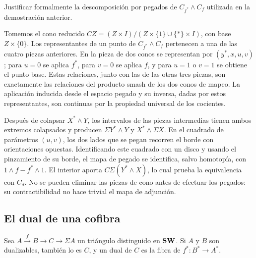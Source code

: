 \begin{ejer}
Justificar formalmente la descomposición por pegados de $C_{f^*}\wedge C_f$ utilizada en la demostración anterior.
\end{ejer}

\begin{sol}
Tomemos el cono reducido $CZ=(Z\times I)/(Z\times\{1\}\cup\{*\}\times I)$, con base $Z\times\{0\}$. Los representantes de un punto de $C_{f^*}\wedge C_f$ pertenecen a una de las cuatro piezas anteriores. En la pieza de dos conos se representan por $(y^*,x,u,v)$; para $u=0$ se aplica $f^*$, para $v=0$ se aplica $f$, y para $u=1$ o $v=1$ se obtiene el punto base. Estas relaciones, junto con las de las otras tres piezas, son exactamente las relaciones del producto smash de los dos conos de mapeo. La aplicación inducida desde el espacio pegado y su inversa, dadas por estos representantes, son continuas por la propiedad universal de los cocientes.

Después de colapsar $X^*\wedge Y$, los intervalos de las piezas intermedias tienen ambos extremos colapsados y producen $\Sigma Y^*\wedge Y$ y $X^*\wedge\Sigma X$. En el cuadrado de parámetros $(u,v)$, los dos lados que se pegan recorren el borde con orientaciones opuestas. Identificando este cuadrado con un disco y usando el pinzamiento de su borde, el mapa de pegado se identifica, salvo homotopía, con $1\wedge f-f^*\wedge1$. El interior aporta $C\Sigma(Y^*\wedge X)$, lo cual prueba la equivalencia con $C_d$. No se pueden eliminar las piezas de cono antes de efectuar los pegados: su contractibilidad no hace trivial el mapa de adjunción.
\end{sol}

\subsection{El dual de una cofibra}

\begin{prop}\label{teo:cofibra-dual}
Sea $A\xrightarrow{f}B\to C\to\Sigma A$ un triángulo distinguido en $\mathbf{SW}$. Si $A$ y $B$ son dualizables, también lo es $C$, y un dual de $C$ es la fibra de $f^*\colon B^*\to A^*$.
\end{prop}

